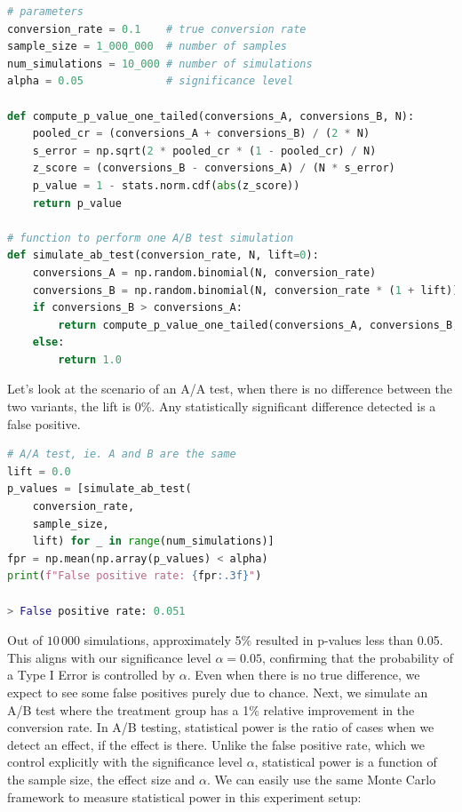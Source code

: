 \documentclass[final,5p,times,twocolumn,authoryear]{elsarticle}
\begin{document}
\begin{minipage}{\linewidth}
\begin{lstlisting}[language=Python, caption=Python code to simulate A/B tests.]
# parameters
conversion_rate = 0.1    # true conversion rate
sample_size = 1_000_000  # number of samples
num_simulations = 10_000 # number of simulations
alpha = 0.05             # significance level

def compute_p_value_one_tailed(conversions_A, conversions_B, N):
    pooled_cr = (conversions_A + conversions_B) / (2 * N)
    s_error = np.sqrt(2 * pooled_cr * (1 - pooled_cr) / N)
    z_score = (conversions_B - conversions_A) / (N * s_error)
    p_value = 1 - stats.norm.cdf(abs(z_score))
    return p_value

# function to perform one A/B test simulation
def simulate_ab_test(conversion_rate, N, lift=0):
    conversions_A = np.random.binomial(N, conversion_rate)
    conversions_B = np.random.binomial(N, conversion_rate * (1 + lift))
    if conversions_B > conversions_A:
        return compute_p_value_one_tailed(conversions_A, conversions_B, sample_size)
    else:
        return 1.0
\end{lstlisting}
\end{minipage}

Let's look at the scenario of an A/A test, when there is no difference between the two variants, the lift is 0\%. Any statistically significant difference detected is a false positive.

\begin{minipage}{\linewidth}
\begin{lstlisting}[language=Python, caption=A/A test False Positive Rate (FPR) simulation.]
# A/A test, ie. A and B are the same
lift = 0.0
p_values = [simulate_ab_test(
    conversion_rate,
    sample_size,
    lift) for _ in range(num_simulations)]
fpr = np.mean(np.array(p_values) < alpha)
print(f"False positive rate: {fpr:.3f}")

> False positive rate: 0.051
\end{lstlisting}
\end{minipage}

Out of $ 10\,000 $ simulations, approximately 5\% resulted in p-values less than 0.05. This aligns with our significance level $ \alpha = 0.05 $, confirming that the probability of a Type I Error is controlled by $ \alpha $. Even when there is no true difference, we expect to see some false positives purely due to chance. Next, we simulate an A/B test where the treatment group has a 1\% relative improvement in the conversion rate. In A/B testing, statistical power is the ratio of cases when we detect an effect, if the effect is there. Unlike the false positive rate, which we control explicitly with the significance level $ \alpha $, statistical power is a function of the sample size, the effect size and $ \alpha $. We can easily use the same Monte Carlo framework to measure statistical power in this experiment setup:
\end{document}
